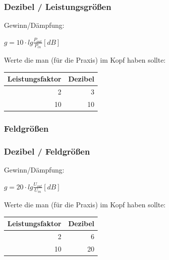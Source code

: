 \begin{frame}
    \frametitle{Dezibel / Leistungsgrößen}

    Gewinn/Dämpfung:

    \begin{center}
        $g = 10 \cdot lg \frac{P_{out}}{P_{in}} [dB]$
    \end{center}

    \vspace{2em}

    Werte die man (für die Praxis) im Kopf haben sollte:

    \begin{center}
    \footnotesize
    \begin{tabular}{|r|r|}\hline
        \textbf{Leistungsfaktor} & \textbf{Dezibel} \\ \hline \hline
         2                       &  3               \\ \hline
        10                       & 10               \\ \hline
    \end{tabular}
    \end{center}

\end{frame}

\subsubsection{Feldgrößen}

\begin{frame}
    \frametitle{Dezibel / Feldgrößen}


    Gewinn/Dämpfung:

    \begin{center}
        $g = 20 \cdot lg \frac{U_{out}}{U_{in}} [dB]$
    \end{center}

    \vspace{2em}
    
    Werte die man (für die Praxis) im Kopf haben sollte:

    \begin{center}
    \footnotesize
    \begin{tabular}{|r|r|}\hline
        \textbf{Leistungsfaktor} & \textbf{Dezibel} \\ \hline \hline
         2                       &  6               \\ \hline
        10                       & 20               \\ \hline
    \end{tabular}
    \end{center}

\end{frame}

